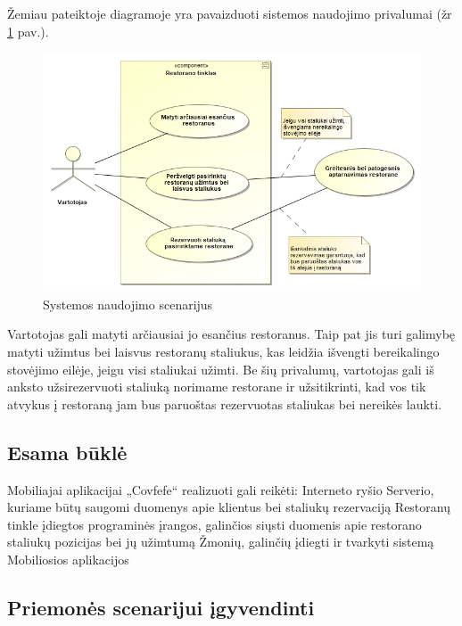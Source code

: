 \documentclass{VUMIFPSkursinis}
\begin{document}
Žemiau pateiktoje diagramoje yra pavaizduoti sistemos naudojimo privalumai (žr \ref{fig:systemusingbenefits} pav.).

	\begin {figure}[H]
	\centering	
		\caption{Systemos naudojimo scenarijus}
		\includegraphics[scale=0.7]{img/3lab/SystemUsingBenefits.jpg}
		
		\label{fig:systemusingbenefits}
	\end{figure}

Vartotojas gali matyti arčiausiai jo esančius restoranus. Taip pat jis turi galimybę matyti užimtus bei laisvus restoranų staliukus, kas leidžia išvengti bereikalingo stovėjimo eilėje, jeigu visi staliukai užimti. Be šių privalumų, vartotojas gali iš anksto užsirezervuoti staliuką norimame restorane ir užsitikrinti, kad vos tik atvykus į restoraną jam bus paruoštas rezervuotas staliukas bei nereikės laukti.

\subsection{Esama būklė}

Mobiliajai aplikacijai „Covfefe“ realizuoti gali reikėti:
Interneto ryšio
Serverio, kuriame būtų saugomi duomenys apie klientus bei staliukų rezervaciją
Restoranų tinkle įdiegtos programinės įrangos, galinčios siųsti duomenis apie restorano staliukų pozicijas bei jų užimtumą
Žmonių, galinčių įdiegti ir tvarkyti sistemą
Mobiliosios aplikacijos

\subsection{Priemonės scenarijui įgyvendinti}
\end{document}
